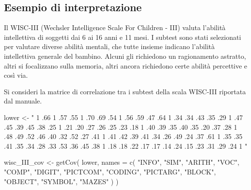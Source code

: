 \documentclass[
  11pt,
]{krantz}
\makeatletter
\newenvironment{Shaded}{\begin{snugshade}}{\end{snugshade}}
\newcommand{\AttributeTok}[1]{\textcolor[rgb]{0.61,0.61,0.61}{#1}}
\newcommand{\FunctionTok}[1]{\textcolor[rgb]{0,0,0}{#1}}
\newcommand{\NormalTok}[1]{#1}
\newcommand{\OtherTok}[1]{\textcolor[rgb]{0.37,0.37,0.37}{#1}}
\newcommand{\StringTok}[1]{\textcolor[rgb]{0.5,0.5,0.5}{#1}}
\newenvironment{kframe}{%
\medskip{}
\setlength{\fboxsep}{.8em}
 \def\at@end@of@kframe{}%
 \ifinner\ifhmode%
  \def\at@end@of@kframe{\end{minipage}}%
  \begin{minipage}{\columnwidth}%
 \fi\fi%
 \def\FrameCommand##1{\hskip\@totalleftmargin \hskip-\fboxsep
 \colorbox{shadecolor}{##1}\hskip-\fboxsep
     \hskip-\linewidth \hskip-\@totalleftmargin \hskip\columnwidth}%
 \MakeFramed {\advance\hsize-\width
   \@totalleftmargin\z@ \linewidth\hsize
   \@setminipage}}%
 {\par\unskip\endMakeFramed%
 \at@end@of@kframe}
\renewenvironment{Shaded}{\begin{kframe}}{\end{kframe}}
\theoremstyle{definition}
\theoremstyle{definition}
\theoremstyle{definition}
\theoremstyle{definition}
\theoremstyle{remark}
\makeatother
\begin{document}
\hypertarget{esempio-di-interpretazione}{%
\subsection{Esempio di interpretazione}\label{esempio-di-interpretazione}}

Il WISC-III (Wechsler Intelligence Scale For Children - III) valuta l'abilità intellettiva di soggetti dai 6 ai 16 anni e 11 mesi. I subtest sono stati selezionati per valutare diverse abilità mentali, che tutte insieme indicano l'abilità intellettiva generale del bambino. Alcuni gli richiedono un ragionamento astratto, altri si focalizzano sulla memoria, altri ancora richiedono certe abilità percettive e così via.

Si consideri la matrice di correlazione tra i subtest della scala WISC-III riportata dal manuale.

\begin{Shaded}
\begin{Highlighting}[]
\NormalTok{lower }\OtherTok{\textless{}{-}} \StringTok{"}
\StringTok{1}
\StringTok{.66      1}
\StringTok{.57 .55      1}
\StringTok{.70 .69 .54       1}
\StringTok{.56 .59 .47 .64      1}
\StringTok{.34 .34 .43 .35 .29      1}
\StringTok{.47 .45 .39 .45 .38 .25      1}
\StringTok{.21 .20 .27 .26 .25 .23 .18      1}
\StringTok{.40 .39 .35 .40 .35 .20 .37 .28      1}
\StringTok{.48 .49 .52 .46 .40 .32 .52 .27 .41      1}
\StringTok{.41 .42 .39 .41 .34 .26 .49 .24 .37 .61      1}
\StringTok{.35 .35 .41 .35 .34 .28 .33 .53 .36 .45 .38      1}
\StringTok{.18 .18 .22 .17 .17 .14 .24 .15 .23 .31 .29 .24     1}
\StringTok{"}
\end{Highlighting}
\end{Shaded}

\begin{Shaded}
\begin{Highlighting}[]
\NormalTok{wisc\_III\_cov }\OtherTok{\textless{}{-}} \FunctionTok{getCov}\NormalTok{(}
\NormalTok{  lower,}
  \AttributeTok{names =} \FunctionTok{c}\NormalTok{(}
    \StringTok{"INFO"}\NormalTok{, }\StringTok{"SIM"}\NormalTok{, }\StringTok{"ARITH"}\NormalTok{, }\StringTok{"VOC"}\NormalTok{, }\StringTok{"COMP"}\NormalTok{, }\StringTok{"DIGIT"}\NormalTok{, }\StringTok{"PICTCOM"}\NormalTok{,}
    \StringTok{"CODING"}\NormalTok{, }\StringTok{"PICTARG"}\NormalTok{, }\StringTok{"BLOCK"}\NormalTok{, }\StringTok{"OBJECT"}\NormalTok{, }\StringTok{"SYMBOL"}\NormalTok{, }\StringTok{"MAZES"}
\NormalTok{  )}
\NormalTok{)}
\end{Highlighting}
\end{Shaded}
\end{document}
